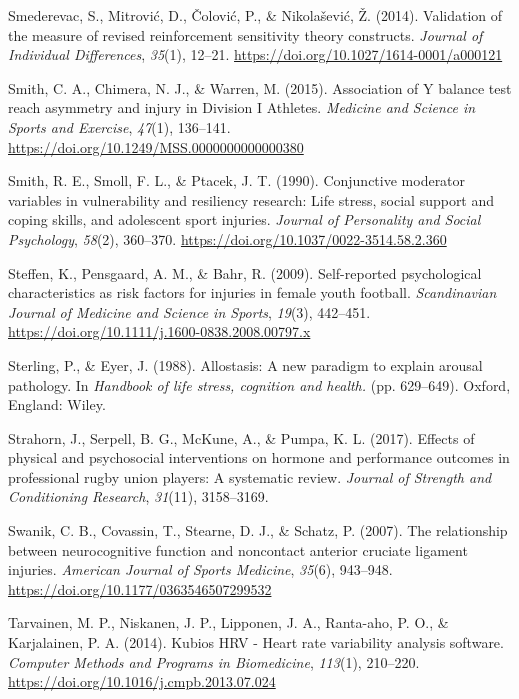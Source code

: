 \documentclass[
  english,
  man,floatsintext]{apa6}
\begin{document}
\leavevmode\hypertarget{ref-Smederevac2014}{}%
Smederevac, S., Mitrović, D., Čolović, P., \& Nikolašević, Ž. (2014). Validation of the measure of revised reinforcement sensitivity theory constructs. \emph{Journal of Individual Differences}, \emph{35}(1), 12--21. \url{https://doi.org/10.1027/1614-0001/a000121}

\leavevmode\hypertarget{ref-Smith2015}{}%
Smith, C. A., Chimera, N. J., \& Warren, M. (2015). Association of Y balance test reach asymmetry and injury in Division I Athletes. \emph{Medicine and Science in Sports and Exercise}, \emph{47}(1), 136--141. \url{https://doi.org/10.1249/MSS.0000000000000380}

\leavevmode\hypertarget{ref-Smith1990}{}%
Smith, R. E., Smoll, F. L., \& Ptacek, J. T. (1990). Conjunctive moderator variables in vulnerability and resiliency research: Life stress, social support and coping skills, and adolescent sport injuries. \emph{Journal of Personality and Social Psychology}, \emph{58}(2), 360--370. \url{https://doi.org/10.1037/0022-3514.58.2.360}

\leavevmode\hypertarget{ref-Steffen2009}{}%
Steffen, K., Pensgaard, A. M., \& Bahr, R. (2009). Self-reported psychological characteristics as risk factors for injuries in female youth football. \emph{Scandinavian Journal of Medicine and Science in Sports}, \emph{19}(3), 442--451. \url{https://doi.org/10.1111/j.1600-0838.2008.00797.x}

\leavevmode\hypertarget{ref-Sterling1988}{}%
Sterling, P., \& Eyer, J. (1988). Allostasis: A new paradigm to explain arousal pathology. In \emph{Handbook of life stress, cognition and health.} (pp. 629--649). Oxford, England: Wiley.

\leavevmode\hypertarget{ref-Strahorn2017}{}%
Strahorn, J., Serpell, B. G., McKune, A., \& Pumpa, K. L. (2017). Effects of physical and psychosocial interventions on hormone and performance outcomes in professional rugby union players: A systematic review. \emph{Journal of Strength and Conditioning Research}, \emph{31}(11), 3158--3169.

\leavevmode\hypertarget{ref-Swanik2007}{}%
Swanik, C. B., Covassin, T., Stearne, D. J., \& Schatz, P. (2007). The relationship between neurocognitive function and noncontact anterior cruciate ligament injuries. \emph{American Journal of Sports Medicine}, \emph{35}(6), 943--948. \url{https://doi.org/10.1177/0363546507299532}

\leavevmode\hypertarget{ref-Tarvainen2014}{}%
Tarvainen, M. P., Niskanen, J. P., Lipponen, J. A., Ranta-aho, P. O., \& Karjalainen, P. A. (2014). Kubios HRV - Heart rate variability analysis software. \emph{Computer Methods and Programs in Biomedicine}, \emph{113}(1), 210--220. \url{https://doi.org/10.1016/j.cmpb.2013.07.024}
\end{document}
